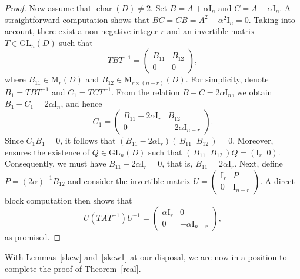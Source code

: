 \documentclass[11pt]{article}
\theoremstyle{definition}
\begin{document}
{{{{\begin{proof}
					Now assume that $\operatorname{char}(D)\neq 2$. Set $B=A+\alpha \mathrm{I}_{n}$ and  $C=A-\alpha \mathrm{I}_{n}.$
					A straightforward computation shows that $BC=CB=A^{2}-\alpha^{2}\mathrm{I}_{n}=0.$ Taking \cite[Lemma~2.1]{Pa_BiDuHaSo_2023} into account, there exist a non-negative integer $r$ and an invertible matrix
					$T\in \mathrm{GL}_{n}(D)$ such that $$TBT^{-1}=
					\begin{pmatrix}
						B_{11} & B_{12} \\
						0 & 0
					\end{pmatrix},$$
					where $B_{11}\in \mathrm{M}_{r}(D)$ and $B_{12}\in \mathrm{M}_{r\times (n-r)}(D)$. For simplicity, denote $B_{1}=TBT^{-1}$ and $C_{1}=TCT^{-1}.$ From the relation $B-C=2\alpha \mathrm{I}_{n}$, we obtain $B_{1}-C_{1}=2\alpha \mathrm{I}_{n}$, and hence
					$$C_{1}=
					\begin{pmatrix}
						B_{11}-2\alpha \mathrm{I}_{r} & B_{12} \\
						0 & -2\alpha \mathrm{I}_{n-r}
					\end{pmatrix}.$$ Since $C_{1}B_{1}=0$, it follows that $(B_{11}-2\alpha \mathrm{I}_{r})(\,B_{11}\;\; B_{12}\,)=0.$
					Moreover, \cite[Lemma~2.2]{Pa_BiDuHaSo_2023} ensures the existence of
					$Q\in \mathrm{GL}_{n}(D)$ such that
					$(\,B_{11}\;\; B_{12}\,)Q=(\mathrm{I}_{r}\;\; 0).$
					Consequently, we must have $B_{11}-2\alpha \mathrm{I}_{r}=0$, that is, $B_{11}=2\alpha \mathrm{I}_{r}.$ Next, define $P=(2\alpha)^{-1}B_{12}$ and consider the invertible matrix $U=
					\begin{pmatrix}
						\mathrm{I}_{r} & P \\
						0 & \mathrm{I}_{n-r}
					\end{pmatrix}.$
					A direct block computation then shows that
					$$U(TAT^{-1})U^{-1}=
					\begin{pmatrix}
						\alpha \mathrm{I}_{r} & 0 \\
						0 & -\alpha \mathrm{I}_{n-r}
					\end{pmatrix},$$
					as promised.
				\end{proof}
				
				With Lemmas~\ref{skew} and~\ref{skew1} at our disposal, we are now in a position to complete the proof of Theorem~\ref{real}.
				
}}}}
\end{document}
